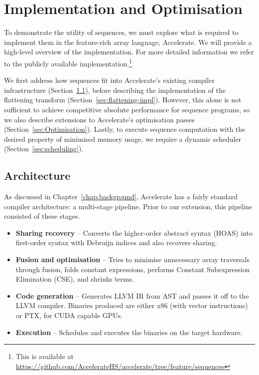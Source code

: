 \chapter{Implementation and Optimisation}
\label{chap:implementation}

To demonstrate the utility of sequences, we must explore what is required to implement them in the feature-rich array language, Accelerate. We will provide a high-level overview of the implementation. For more detailed information we refer to the publicly available implementation.\footnote{This is available at \url{https://github.com/AccelerateHS/accelerate/tree/feature/sequences}}

We first address how sequences fit into Accelerate's existing compiler infrastructure (Section~\ref{sec:seq-architecture}), before describing the implementation of the flattening transform (Section~\ref{sec:flattening-impl}). However, this alone is not sufficient to achieve competitive absolute performance for sequence programs, so we also describe extensions to Accelerate's optimisation passes (Section~\ref{sec:Optimisation}). Lastly, to execute sequence computation with the desired property of minimised memory usage, we require a dynamic scheduler (Section~\ref{sec:scheduling}).

\section{Architecture}
\label{sec:seq-architecture}
As discussed in Chapter~\ref{chap:background}, Accelerate has a fairly standard compiler architecture: a multi-stage pipeline. Prior to our extension, this pipeline consisted of these stages.

\begin{itemize}
%
\item \textbf{Sharing recovery} -- Converts the higher-order abstract syntax (HOAS) into first-order syntax with Debruijn indices and also recovers sharing.
%
%
\item \textbf{Fusion and optimisation} -- Tries to minimise unnecessary array traversals through fusion, folds constant expressions, performs Constant Subexpression Elimination (CSE), and shrinks terms.
%
\item \textbf{Code generation} -- Generates LLVM IR from AST and passes it off to the LLVM compiler. Binaries produced are either x86 (with vector instructions) or PTX, for CUDA capable GPUs.
%
\item \textbf{Execution} -- Schedules and executes the binaries on the target hardware.
\end{itemize}

